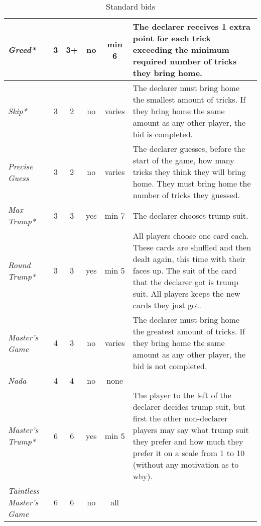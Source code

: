 \begin{table}
\begin{center}
{\begin{tabular*}{\textwidth}{ lcccc | p{5cm} }
					\textit{Greed*} &
					3 & 3+ & no & min 6 &
					The declarer receives 1 extra point for each trick exceeding the minimum required number of tricks they bring home.
					\\ \hline
					
					\textit{Skip*} &
					3 & 2 & no & varies &
					The declarer must bring home the smallest amount of tricks. If they bring home the same amount as any other player, the bid is completed.
					\\ \hline
					
					\textit{Precise Guess} &
					3 & 2 & no & varies &
					The declarer guesses, before the start of the game, how many tricks they think they will bring home. They must bring home the number of tricks they guessed.
					\\ \hline
					
					\textit{Max Trump*} &
					3 & 3 & yes & min 7 &
					The declarer chooses trump suit.
					\\ \hline
					
					\textit{Round Trump*} &
					3 & 3 & yes & min 5 &
					All players choose one card each. These cards are shuffled and then dealt again, this time with their faces up. The suit of the card that the declarer got is trump suit. All players keeps the new cards they just got.
					\\ \hline
					
					\textit{Master's Game} &
					4 & 3 & no & varies &
					The declarer must bring home the greatest amount of tricks. If they bring home the same amount as any other player, the bid is not completed. 
					\\ \hline
					
					\textit{Nada} &
					4 & 4 & no & none &
					\\ \hline
					
					\textit{Master's Trump*} &
					6 & 6 & yes & min 5 &
					The player to the left of the declarer decides trump suit, but first the other non-declarer players may say what trump suit they prefer and how much they prefer it on a scale from 1 to 10 (without any motivation as to why).
					\\ \hline
					
					\textit{Taintless Master's Game} &
					6 & 6 & no & all &
			\end{tabular*}
		}
	\end{center}
	\caption{Standard bids}
	\label{tab:standardBids}
\end{table}
